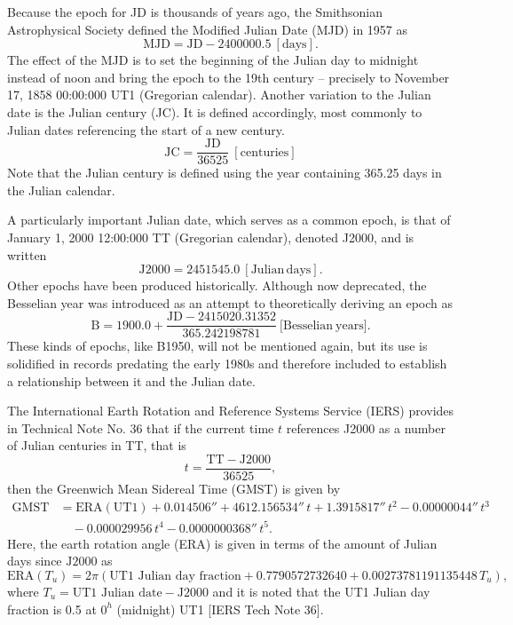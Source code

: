 \documentclass[11pt,dvipsnames]{thesis}
\begin{document}
Because the epoch for JD is thousands of years ago, the Smithsonian Astrophysical Society defined the Modified Julian Date (MJD) in 1957 as
\begin{equation}
\mathrm{MJD} = \mathrm{JD} - \num{2400000.5} \ [\mathrm{days}].
\end{equation}
The effect of the MJD is to set the beginning of the Julian day to midnight instead of noon and bring the epoch to the 19th century -- precisely to November 17, 1858 00:00:000 UT1 (Gregorian calendar). Another variation to the Julian date is the Julian century (JC). It is defined accordingly, most commonly to Julian dates referencing the start of a new century.
\begin{equation}
\mathrm{JC} = \frac{\mathrm{JD}}{\num{36525}} \ [\mathrm{centuries}]
\end{equation}
Note that the Julian century is defined using the year containing 365.25 days in the Julian calendar.

A particularly important Julian date, which serves as a common epoch, is that of January 1, 2000 12:00:000 TT (Gregorian calendar), denoted J2000, and is written
\begin{equation}
\mathrm{J2000} = 2451545.0 \ [\mathrm{Julian \,days}].
\end{equation}
Other epochs have been produced historically. Although now deprecated, the Besselian year was introduced as an attempt to theoretically deriving an epoch as
\begin{equation}
\mathrm{B} = 1900.0 + \frac{\mathrm{JD} - 2415020.31352}{365.242198781} \ [\mathrm{Besselian\ years]}.
\end{equation}
These kinds of epochs, like B1950, will not be mentioned again, but its use is solidified in records predating the early 1980s and therefore included to establish a relationship between it and the Julian date.

The International Earth Rotation and Reference Systems Service (IERS) provides in Technical Note No. 36 that if the current time $t$ references J2000 as a number of Julian centuries in TT, that is
\begin{equation}
t = \frac{\mathrm{TT} - \mathrm{J2000}}{36525},
\end{equation}
then the Greenwich Mean Sidereal Time (GMST) is given by
\begin{align}
\mathrm{GMST} &= \mathrm{ERA}(\mathrm{UT1}) + 0.014506'' + 4612.156534'' \,t + 1.3915817''\,t^2 - 0.00000044''\,t^3 \nonumber\\&\quad - 0.000029956\,t^4 - 0.0000000368''\,t^5.
\end{align}
Here, the earth rotation angle (ERA) is given in terms of the amount of Julian days since $\mathrm{J2000}$ as
\begin{equation}
\mathrm{ERA}(T_u) = 2\pi (\text{UT1 Julian day fraction} + 0.7790572732640 + 0.00273781191135448\,T_u),
\end{equation}
where $T_u = \text{UT1 Julian date} - \mathrm{J2000}$ and it is noted that the UT1 Julian day fraction is 0.5 at $0^h$ (midnight) UT1 [IERS Tech Note 36].
\end{document}
